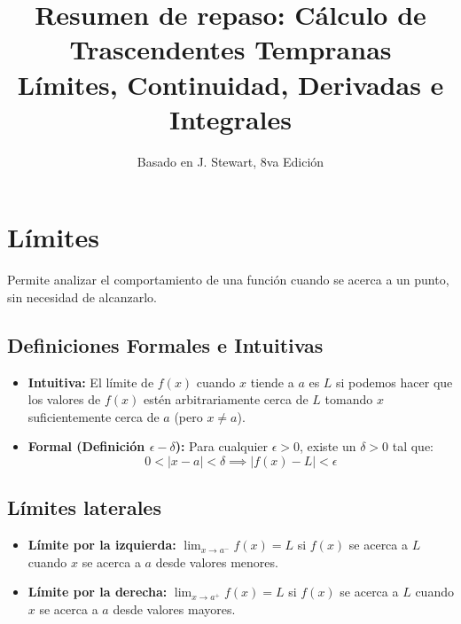 \documentclass[a4paper,12pt]{article}
\title{\textbf{Resumen de repaso: Cálculo de Trascendentes Tempranas}\\ \large Límites, Continuidad, Derivadas e Integrales}
\author{Basado en J. Stewart, 8va Edición}
\date{}
\theoremstyle{definition}
\begin{document}
\maketitle

\section{Límites}

Permite analizar el comportamiento de una función cuando se acerca a un punto, sin necesidad de alcanzarlo.

\subsection{Definiciones Formales e Intuitivas}

\begin{itemize}
    \item \textbf{Intuitiva:} El límite de $f(x)$ cuando $x$ tiende a $a$ es $L$ si podemos hacer que los valores de $f(x)$ estén arbitrariamente cerca de $L$ tomando $x$ suficientemente cerca de $a$ (pero $x \neq a$).
    \item \textbf{Formal (Definición $\epsilon-\delta$):}
    Para cualquier $\epsilon > 0$, existe un $\delta > 0$ tal que:
    \[
    0 < |x - a| < \delta \implies |f(x) - L| < \epsilon
    \]
\end{itemize}

\subsection{Límites laterales}
\begin{itemize}
    \item \textbf{Límite por la izquierda:} $\lim_{x \to a^-} f(x) = L$ si $f(x)$ se acerca a $L$ cuando $x$ se acerca a $a$ desde valores menores.
    \item \textbf{Límite por la derecha:} $\lim_{x \to a^+} f(x) = L$ si $f(x)$ se acerca a $L$ cuando $x$ se acerca a $a$ desde valores mayores.
\end{itemize}
\end{document}
